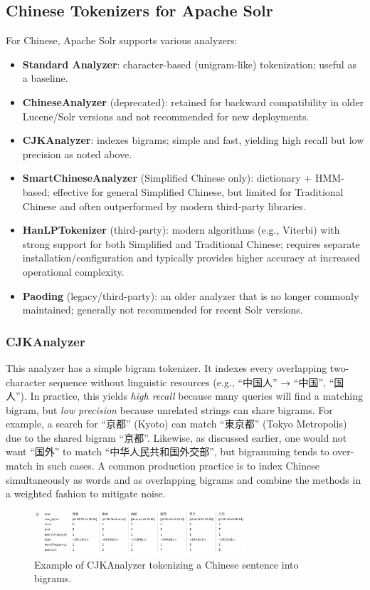 \documentclass[11pt]{article}
\begin{document}
\subsection{Chinese Tokenizers for Apache Solr}
For Chinese, Apache Solr supports various analyzers:
\begin{itemize}
    \item \textbf{Standard Analyzer}: character-based (unigram-like) tokenization; useful as a baseline.
    \item \textbf{ChineseAnalyzer} (deprecated): retained for backward compatibility in older Lucene/Solr versions and not recommended for new deployments.
    \item \textbf{CJKAnalyzer}: indexes bigrams; simple and fast, yielding high recall but low precision as noted above.
    \item \textbf{SmartChineseAnalyzer} (Simplified Chinese only): dictionary + HMM-based; effective for general Simplified Chinese, but limited for Traditional Chinese and often outperformed by modern third-party libraries.
    \item \textbf{HanLPTokenizer} (third-party): modern algorithms (e.g., Viterbi) with strong support for both Simplified and Traditional Chinese; requires separate installation/configuration and typically provides higher accuracy at increased operational complexity.
    \item \textbf{Paoding} (legacy/third-party): an older analyzer that is no longer commonly maintained; generally not recommended for recent Solr versions.
\end{itemize}

\subsubsection{CJKAnalyzer}
This analyzer has a simple bigram tokenizer. It indexes every overlapping two-character sequence without linguistic resources (e.g., “中国人” → “中国”, “国人”). In practice, this yields \textit{high recall} because many queries will find a matching bigram, but \textit{low precision} because unrelated strings can share bigrams. For example, a search for “京都” (Kyoto) can match “東京都” (Tokyo Metropolis) due to the shared bigram “京都”. Likewise, as discussed earlier, one would not want “国外” to match “中华人民共和国外交部”, but bigramming tends to over-match in such cases. A common production practice is to index Chinese simultaneously as words and as overlapping bigrams and combine the methods in a weighted fashion to mitigate noise.
\begin{figure}[h!]
    \centering
    \includegraphics[width=0.7\textwidth]{image2.png}
    \caption{Example of CJKAnalyzer tokenizing a Chinese sentence into bigrams.}
    \label{fig:cjk_analyzer}
\end{figure}
\end{document}
